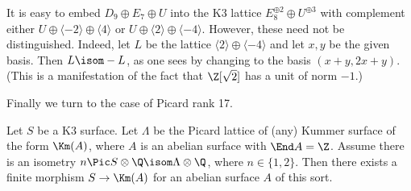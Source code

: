 \documentclass{article}
\begin{document}
\begin{rmk}\label{rem:change-signs}
  It is easy to embed $D_9 \oplus E_7 \oplus U$ into the K3 lattice
  $E_8^{\oplus 2} \oplus U^{\oplus 3}$ with complement either
  $U \oplus \langle -2 \rangle \oplus \langle 4 \rangle$ or
  $U \oplus \langle 2 \rangle \oplus \langle -4 \rangle$.  However,
  these need not be distinguished.  Indeed,
  let $L$ be the lattice $\langle 2 \rangle \oplus \langle -4 \rangle$
  and let $x,y$ be the given basis.  Then $L \isom -L$, as one sees by
  changing to the basis $(x+y, 2x+y)$.  (This is a manifestation of the
  fact that $\Z[\sqrt{2}]$ has a unit of norm $-1$.)  
\end{rmk}


Finally we turn to the case of Picard rank 17.


\begin{prop} Let $S$ be a K3 surface.  Let $\Lambda$ be the Picard lattice of (any) Kummer surface of the form $\Km(A)$, where $A$ is an abelian surface with $\End A = \Z$.   Assume there is an isometry $n\Pic S\otimes\Q\isom \Lambda\otimes\Q$, where $n \in \{1,2\}$.  Then there exists a finite morphism $S\to\Km(A)$ for an abelian surface $A$ of this sort.
\end{prop}
\end{document}
